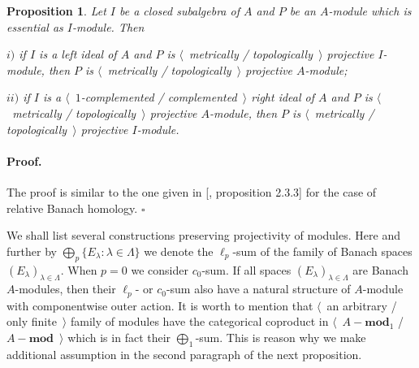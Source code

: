 \documentclass[12pt]{article}
\newtheorem{proposition}[theorem]{Proposition}
\renewenvironment{proof}{\paragraph{Proof.}}{\hfill$\square$\medskip}
\begin{document}
\begin{proposition}\label{MetTopProjUnderChangeOfAlg} Let $I$ be a closed subalgebra of $A$ and $P$ be an $A$-module which is essential as $I$-module. Then

$i)$ if $I$ is a left ideal of $A$ and $P$ is $\langle$~metrically / topologically~$\rangle$  projective $I$-module, then $P$ is $\langle$~metrically / topologically~$\rangle$ projective $A$-module;

$ii)$ if $I$ is a $\langle$~$1$-complemented / complemented~$\rangle$ right ideal of $A$ and $P$ is $\langle$~metrically / topologically~$\rangle$ projective $A$-module, then $P$ is $\langle$~metrically / topologically~$\rangle$ projective $I$-module.
\end{proposition}
\begin{proof} The proof is similar to the one given in [\cite{RamsHomPropSemgroupAlg}, proposition 2.3.3] for the case of relative Banach homology.
\end{proof}

We shall list several constructions preserving projectivity of modules. Here and further by $\bigoplus_p\{E_\lambda:\lambda\in\Lambda\}$ we denote the $\ell_p$-sum of the family of Banach spaces $(E_\lambda)_{\lambda\in\Lambda}$. When $p=0$ we consider $c_0$-sum. If all spaces $(E_\lambda)_{\lambda\in\Lambda}$ are Banach $A$-modules, then their $\ell_p$- or $c_0$-sum also have a natural structure of $A$-module with componentwise outer action. It is worth to mention that $\langle$~an arbitrary / only finite~$\rangle$ family of modules have the categorical coproduct in $\langle$~$A-\mathbf{mod}_1$ / $A-\mathbf{mod}$~$\rangle$ which is in fact their $\bigoplus_1$-sum. This is reason why we make additional assumption in the second paragraph of the next proposition.
\end{document}
